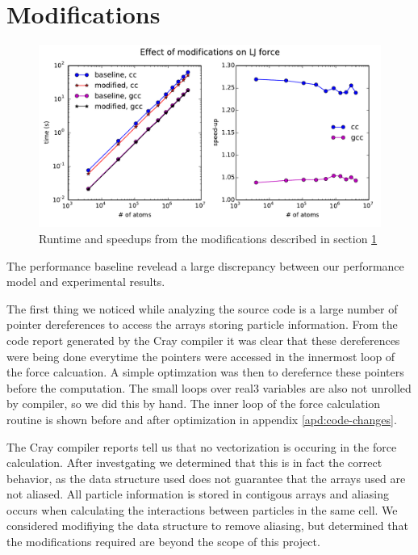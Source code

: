 \documentclass[12pt]{article}
\begin{document}
\section{Modifications}
\label{sec:mods}

\begin{figure}[h!]
  \centering
  \includegraphics[width=\textwidth]{../figs/modified_forceLJ}
  \caption{Runtime and speedups from the modifications described in
    section \ref{sec:mods}}
  \label{fig:mod-force}
\end{figure}

The performance baseline revelead a large discrepancy between our
performance model and experimental results.

The first thing we noticed while analyzing the source code is a large
number of pointer dereferences to access the arrays storing particle
information. From the code report generated by the Cray compiler it
was clear that these dereferences were being done everytime the
pointers were accessed in the innermost loop of the force
calcuation. A simple optimzation was then to derefernce these pointers
before the computation. The small loops over real3 variables are also
not unrolled by compiler, so we did this by hand. The inner loop of
the force calculation routine is shown before and after optimization
in appendix \ref{apd:code-changes}.

The Cray compiler reports tell us that no vectorization is occuring in
the force calculation. After investgating we determined that this is
in fact the correct behavior, as the data structure used does not
guarantee that the arrays used are not aliased. All particle
information is stored in contigous arrays and aliasing occurs when
calculating the interactions between particles in the same cell. We
considered modifiying the data structure to remove aliasing, but
determined that the modifications required are beyond the scope of
this project.
\end{document}
